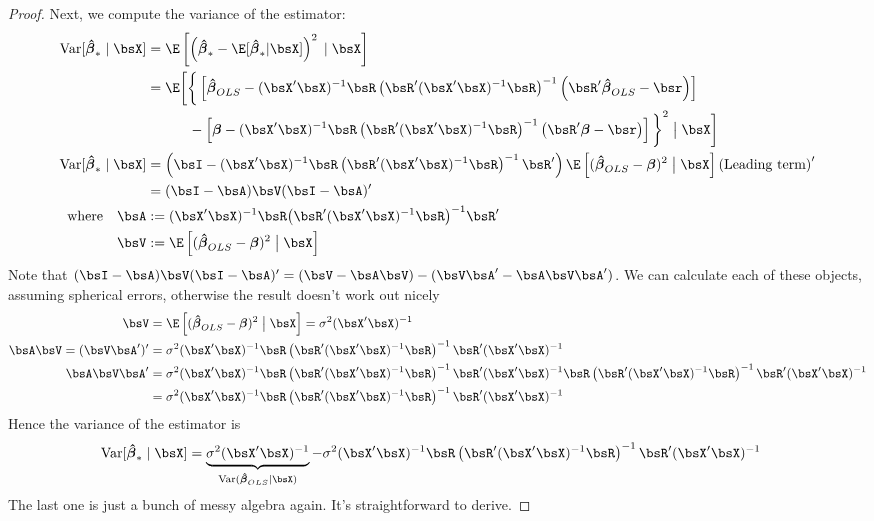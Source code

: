 \documentclass[12pt]{article}
\theoremstyle{plain}
\theoremstyle{definition}
\theoremstyle{remark}
\newcommand{\bsbeta}{\boldsymbol{\beta}}
\newcommand{\bshatbeta}{\boldsymbol{\hat{\beta}}}
\newcommand{\Var}{\operatorname{Var}}
\begin{document}
\begin{proof}
Next, we compute the variance of the estimator:
\begin{align*}
  \Var[\bshatbeta_*\;|\;\bsX]
  &=
  \E\left[
    \left(\bshatbeta_*- \E[\bshatbeta_*|\bsX]\right)^2
  \;|\;\bsX \right] \\
  &=
  \E\bigg[
  \bigg\{
  \left[
  \bshatbeta_{OLS} - (\bsX'\bsX)^{-1}  \bsR
  \left(\bsR'(\bsX'\bsX)^{-1}  \bsR\right)^{-1}
  \left(\bsR'\bshatbeta_{OLS} -  \bsr\right)
  \right]\\
  &\qquad\quad
  -
  \left[
  \bsbeta -
  (\bsX'\bsX)^{-1}  \bsR \left(\bsR'(\bsX'\bsX)^{-1}\bsR\right)^{-1} \left(\bsR' \bsbeta -\bsr\right)
  \right]
  \bigg\}^2
  \;\big|\;\bsX
  \bigg] \\
  \Var[\bshatbeta_*\;|\;\bsX]
  &=
  \left(
  \bsI - (\bsX'\bsX)^{-1}  \bsR \left(\bsR'(\bsX'\bsX)^{-1}  \bsR\right)^{-1} \bsR'
  \right)
  \E\left[ (\bshatbeta_{OLS}-\bsbeta)^2 \;\big|\;\bsX \right]
  \left(
  \text{Leading term}
  \right)' \\
  &= (\bsI - \bsA)\bsV(\bsI-\bsA)'
  \\
  \text{where}
  \quad
  \bsA &:=
    (\bsX'\bsX)^{-1}  \bsR \big(\bsR'(\bsX'\bsX)^{-1}  \bsR\big)^{-1} \bsR' \\
  \bsV
  &:= \E\left[ (\bshatbeta_{OLS}-\bsbeta)^2 \;\big|\;\bsX \right]
\end{align*}
Note that
$(\bsI-\bsA)\bsV(\bsI-\bsA)'=(\bsV-\bsA\bsV)-(\bsV\bsA'-\bsA\bsV\bsA')$.
We can calculate each of these objects, assuming spherical errors,
otherwise the result doesn't work out nicely
\begin{align*}
  \bsV
  &=
  \E\left[ (\bshatbeta_{OLS}-\bsbeta)^2 \;\big|\;\bsX \right]
  =
  \sigma^2(\bsX'\bsX)^{-1} \\
  \bsA\bsV = (\bsV\bsA')'
  &=
  \sigma^2(\bsX'\bsX)^{-1}  \bsR \left(\bsR'(\bsX'\bsX)^{-1}  \bsR\right)^{-1} \bsR'
  (\bsX'\bsX)^{-1} \\
  \bsA\bsV\bsA'
  &=
  \sigma^2(\bsX'\bsX)^{-1}  \bsR \left(\bsR'(\bsX'\bsX)^{-1}  \bsR\right)^{-1} \bsR'
  (\bsX'\bsX)^{-1}
  \bsR \left(\bsR'(\bsX'\bsX)^{-1}  \bsR\right)^{-1} \bsR'(\bsX'\bsX)^{-1}
  \\
  &=
  \sigma^2(\bsX'\bsX)^{-1}  \bsR
  \left(\bsR'(\bsX'\bsX)^{-1}  \bsR\right)^{-1} \bsR'(\bsX'\bsX)^{-1}
\end{align*}
Hence the variance of the estimator is
\begin{align*}
  \Var[\bshatbeta_*\;|\;\bsX]
  &=
  \underbrace{\sigma^2(\bsX'\bsX)^{-1}}_{\Var(\bshatbeta_{OLS}|\bsX)}
  -
  \sigma^2(\bsX'\bsX)^{-1}  \bsR
  \left(\bsR'(\bsX'\bsX)^{-1}  \bsR\right)^{-1} \bsR'(\bsX'\bsX)^{-1}
\end{align*}
The last one is just a bunch of messy algebra again. It's
straightforward to derive.
\end{proof}
\end{document}
